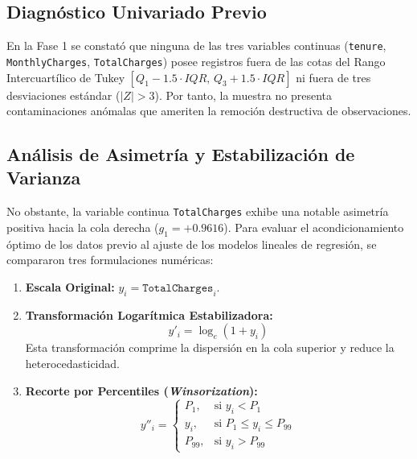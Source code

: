 \documentclass[11pt,letterpaper]{article}
\begin{document}
\subsection{Diagnóstico Univariado Previo}
En la Fase 1 se constató que ninguna de las tres variables continuas (\texttt{tenure}, \texttt{MonthlyCharges}, \texttt{TotalCharges}) posee registros fuera de las cotas del Rango Intercuartílico de Tukey $[Q_1 - 1.5 \cdot IQR, \, Q_3 + 1.5 \cdot IQR]$ ni fuera de tres desviaciones estándar ($|Z| > 3$). Por tanto, la muestra no presenta contaminaciones anómalas que ameriten la remoción destructiva de observaciones.

\subsection{Análisis de Asimetría y Estabilización de Varianza}
No obstante, la variable continua \texttt{TotalCharges} exhibe una notable asimetría positiva hacia la cola derecha ($g_1 = +0.9616$). Para evaluar el acondicionamiento óptimo de los datos previo al ajuste de los modelos lineales de regresión, se compararon tres formulaciones numéricas:

\begin{enumerate}
    \item \textbf{Escala Original:} $y_i = \texttt{TotalCharges}_i$.
    \item \textbf{Transformación Logarítmica Estabilizadora:}
    \begin{equation}
        y'_i = \log_e(1 + y_i)
    \end{equation}
    Esta transformación comprime la dispersión en la cola superior y reduce la heterocedasticidad.
    \item \textbf{Recorte por Percentiles (\textit{Winsorization}):}
    \begin{equation}
        y''_i = \begin{cases}
            P_1, & \text{si } y_i < P_1 \\
            y_i, & \text{si } P_1 \le y_i \le P_{99} \\
            P_{99}, & \text{si } y_i > P_{99}
        \end{cases}
    \end{equation}
\end{enumerate}
\end{document}
